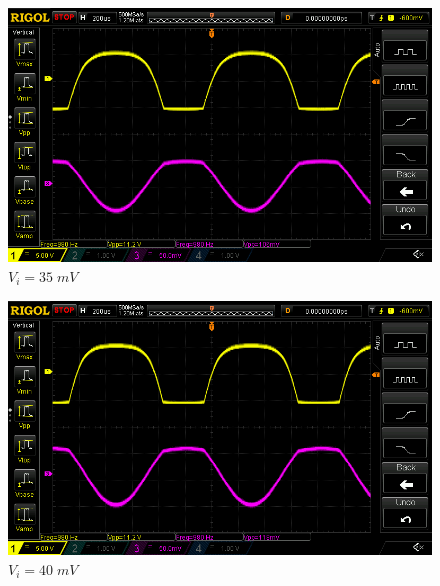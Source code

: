 \documentclass[uplatex,a4paper,11pt,oneside,openany]{jsbook}
\begin{document}
\begin{spacing}{0.71}
\begin{multicols}{2}
  \begin{figure}[H]
     \centering
      \includegraphics[keepaspectratio, scale=0.28, angle=0]
                  {rigol/figs/IOCharM1Y1_2kR/35mV.png}
                  \caption{$V_i=35\;mV$}
                  \label{fig:ioc35}
  \end{figure}

  \begin{figure}[H]
     \centering
      \includegraphics[keepaspectratio, scale=0.28, angle=0]
                {rigol/figs/IOCharM1Y1_2kR/40mV.png}
                \caption{$V_i=40\;mV$}
                \label{fig:ioc40}
  \end{figure}
\end{multicols}


\end{spacing}
\end{document}

